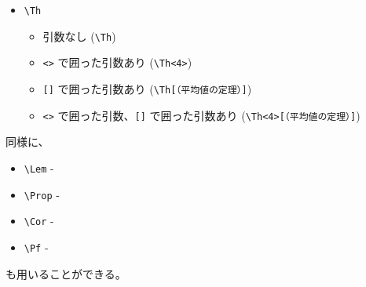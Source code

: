 \documentclass[oneside,10pt,a4paper]{jsarticle}
\begin{document}
\begin{itemize}
\begin{itemize}
        \item 引数なし (\verb|\Formula|)
          \begin{quote}
            \Formula
          \end{quote}
        \item \verb|<>| で囲った引数あり (\verb|\Formula<3>|)
          \begin{quote}
          \end{quote}
        \item \verb|[]| で囲った引数あり (\verb|\Formula[（積和・和積の公式）]|)
          \begin{quote}
            \Formula[（積和・和積の公式）]
          \end{quote}
        \item \verb|<>| で囲った引数、\verb|[]| で囲った引数あり (\verb|\Formula<3>[（積和・和積の公式）]|)
          \begin{quote}
          \end{quote}
      \end{itemize}
    \item \verb|\Th|
      \begin{itemize}
        \item 引数なし (\verb|\Th|)
          \begin{quote}
            \Th
          \end{quote}
        \item \verb|<>| で囲った引数あり (\verb|\Th<4>|)
          \begin{quote}
          \end{quote}
        \item \verb|[]| で囲った引数あり (\verb|\Th[（平均値の定理）]|)
          \begin{quote}
            \Th[（平均値の定理）]
          \end{quote}
        \item \verb|<>| で囲った引数、\verb|[]| で囲った引数あり (\verb|\Th<4>[（平均値の定理）]|)
          \begin{quote}
          \end{quote}
      \end{itemize}
  \end{itemize}

  同様に、
  \begin{itemize}
    \item \verb|\Lem| - \Lem
    \item \verb|\Prop| - \Prop
    \item \verb|\Cor| - \Cor
    \item \verb|\Pf| - \Pf
  \end{itemize}
  も用いることができる。
\end{document}
